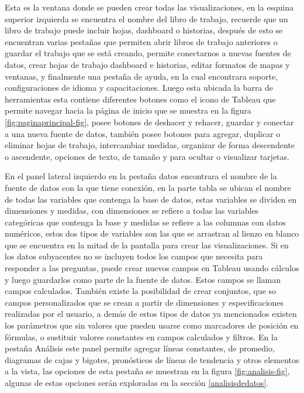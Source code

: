\documentclass[
]{book}
\begin{document}
Esta es la ventana donde se pueden crear todas las visualizaciones, en la esquina superior izquierda se encuentra el nombre del libro de trabajo, recuerde que un libro de trabajo puede incluir hojas, dashboard o historias, después de esto se encuentran varias pestañas que permiten abrir libros de trabajo anteriores o guardar el trabajo que se está creando, permite conectarnos a nuevas fuentes de datos, crear hojas de trabajo dashboard e historias, editar formatos de mapas y ventanas, y finalmente una pestaña de ayuda, en la cual encontrara soporte, configuraciones de idioma y capacitaciones.
Luego esta ubicada la barra de herramientas esta contiene diferentes botones como el icono de Tableau que permite navegar hacia la página de inicio que se muestra en la figura \ref{fig:paginaprincipal-fig}, posee botones de deshacer y rehacer, guardar y conectar a una nueva fuente de datos, también posee botones para agregar, duplicar o eliminar hojas de trabajo, intercambiar medidas, organizar de forma descendente o ascendente, opciones de texto, de tamaño y para ocultar o visualizar tarjetas.

En el panel lateral izquierdo en la pestaña datos encontrara el nombre de la fuente de datos con la que tiene conexión, en la parte tabla se ubican el nombre de todas las variables que contenga la base de datos, estas variables se dividen en dimensiones y medidas, con dimensiones se refiere a todas las variables categóricas que contenga la base y medidas se refiere a las columnas con datos numéricos, estos dos tipos de variables son las que se arrastran al lienzo en blanco que se encuentra en la mitad de la pantalla para crear las visualizaciones. Si en los datos subyacentes no se incluyen todos los campos que necesita para responder a las preguntas, puede crear nuevos campos en Tableau usando cálculos y luego guardarlos como parte de la fuente de datos. Estos campos se llaman campos calculados. También existe la posibilidad de crear conjuntos, que so campos personalizados que se crean a partir de dimensiones y especificaciones realizadas por el usuario, a demás de estos tipos de datos ya mencionados existen los parámetros que sin valores que pueden usarse como marcadores de posición en fórmulas, o sustituir valores constantes en campos calculados y filtros. En la pestaña Análisis este panel permite agregar líneas constantes, de promedio, diagramas de cajas y bigotes, pronósticos de líneas de tendencia y otros elementos a la vista, las opciones de esta pestaña se muestran en la figura \ref{fig:analisis-fig}, algunas de estas opciones serán exploradas en la sección \ref{analisisdedatos}.
\end{document}
